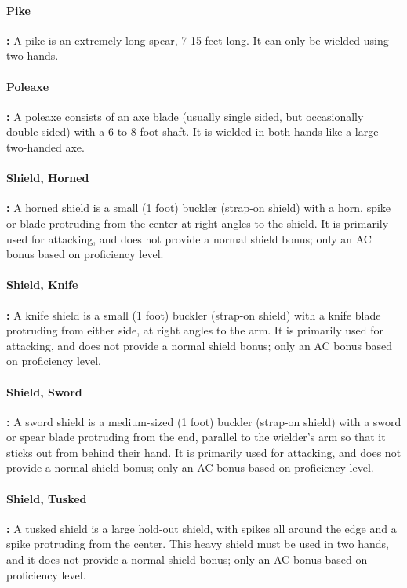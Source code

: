\begin{multicols*}{2}
\paragraph{Pike}\textbf{:} A pike is an extremely long spear, 7-15 feet long. It can only be wielded using two hands.

\paragraph{Poleaxe}\textbf{:} A poleaxe consists of an axe blade (usually single sided, but occasionally double-sided) with a 6-to-8-foot shaft. It is wielded in both hands like a large two-handed axe.

\paragraph{Shield, Horned}\textbf{:} A horned shield is a small (1 foot) buckler (strap-on shield) with a horn, spike or blade protruding from the center at right angles to the shield. It is primarily used for attacking, and does not provide a normal shield bonus; only an AC bonus based on proficiency level.

\paragraph{Shield, Knife}\textbf{:} A knife shield is a small (1 foot) buckler (strap-on shield) with a knife blade protruding from either side, at right angles to the arm. It is primarily used for attacking, and does not provide a normal shield bonus; only an AC bonus based on proficiency level.

\paragraph{Shield, Sword}\textbf{:} A sword shield is a medium-sized (1 foot) buckler (strap-on shield) with a sword or spear blade protruding from the end, parallel to the wielder’s arm so that it sticks out from behind their hand. It is primarily used for attacking, and does not provide a normal shield bonus; only an AC bonus based on proficiency level.

\paragraph{Shield, Tusked}\textbf{:} A tusked shield is a large hold-out shield, with spikes all around the edge and a spike protruding from the center. This heavy shield must be used in two hands, and it does not provide a normal shield bonus; only an AC bonus based on proficiency level.


\end{multicols*}
